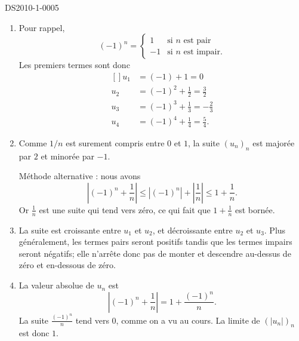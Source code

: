 
\begin{corrige}{DS2010-1-0005}

	\begin{enumerate}
		\item
			Pour rappel, 
			\begin{equation}
				(-1)^n=\begin{cases}
					1	&	\text{si $n$ est pair}\\
					-1	&	 \text{si $n$ est impair.}
				\end{cases}
			\end{equation}
			Les premiers termes sont donc
			\begin{equation}
				\begin{aligned}[]
					u_1&=(-1)+1=0\\
					u_2&=(-1)^2+\frac{ 1 }{2}=\frac{ 3 }{ 2 }\\
					u_3&=(-1)^3+\frac{1}{ 3 }=-\frac{ 2 }{ 3 }\\
					u_4&=(-1)^4+\frac{1}{ 4 }=\frac{ 5 }{ 4 }.
				\end{aligned}
			\end{equation}
		\item
                  Comme $1/n$ est surement compris entre $0$ et $1$, la suite $(u_n)_n$ est majorée par $2$ et minorée par $-1$.

		  Méthode alternative : nous avons
			\begin{equation}
				\left| (-1)^n+\frac{1}{ n } \right| \leq | (-1)^n |+\left| \frac{1}{ n } \right| \leq 1+\frac{1}{ n }.
			\end{equation}
			Or $\frac{1}{ n }$ est une suite qui tend vers zéro, ce qui fait que $1+\frac{1}{ n }$ est bornée.
		\item
			La suite est croissante entre $u_1$ et $u_2$, et décroissante entre $u_2$ et $u_3$. Plus généralement, les termes pairs seront positifs tandis que les termes impairs seront négatifs; elle n'arrête donc pas de monter et descendre au-dessus de zéro et en-dessous de zéro.
		\item
		   La valeur absolue de $u_n$ est
                  \begin{equation}
				\left| (-1)^n+\frac{1}{ n } \right| =1+ \frac{(-1)^n }{ n }.
			\end{equation}
                  La suite $\frac{(-1)^n }{ n }$ tend vers $0$, comme on a vu au cours. La limite de $(|u_n|)_n$ est donc $1$.


\end{enumerate}
\end{corrige}

